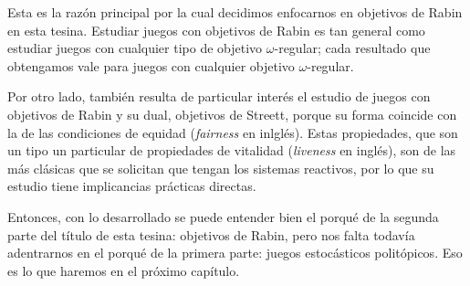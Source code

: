 Esta es la razón principal por la cual decidimos enfocarnos en objetivos de
Rabin en esta tesina. Estudiar juegos con objetivos de Rabin es tan general
como estudiar juegos con cualquier tipo de objetivo $\omega$-regular; cada
resultado que obtengamos vale para juegos con cualquier objetivo
$\omega$-regular.

Por otro lado, también resulta de particular interés el estudio de juegos con
objetivos de Rabin y su dual, objetivos de Streett, porque su forma coincide
con la de las condiciones de equidad (\textit{fairness} en inlglés). Estas
propiedades, que son un tipo un particular de propiedades de vitalidad
(\textit{liveness} en inglés), son de las más clásicas que se solicitan que
tengan los sistemas reactivos, por lo que su estudio tiene implicancias
prácticas directas.


Entonces, con lo desarrollado se puede entender bien el porqué de la segunda
parte del título de esta tesina: objetivos de Rabin, pero nos falta todavía
adentrarnos en el porqué de la primera parte: juegos estocásticos politópicos.
Eso es lo que haremos en el próximo capítulo.

